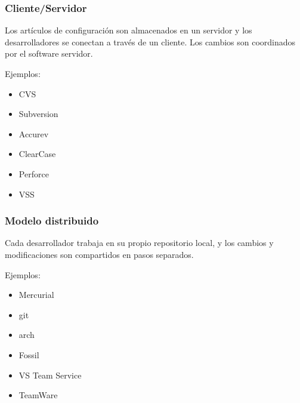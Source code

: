 \begin{frame}
	\frametitle{Cliente/Servidor}
	Los art\'iculos de configuraci\'on son almacenados en un servidor 
	y los desarrolladores se conectan a trav\'es de un cliente. 
	Los cambios son coordinados por el software servidor. 
	
	Ejemplos: 
	\begin{itemize}
		\item CVS
		\item Subversion
		\item Accurev
		\item ClearCase
		\item Perforce
		\item VSS
	\end{itemize}
\end{frame}
\begin{frame}
	\frametitle{Modelo distribuido}
	Cada desarrollador trabaja en su propio repositorio local, y los 
	cambios y modificaciones son compartidos en pasos separados. 

	Ejemplos:
	\begin{itemize}
		\item Mercurial
		\item git
		\item arch
		\item Fossil
		\item VS Team Service
		\item TeamWare
	\end{itemize}
\end{frame}
